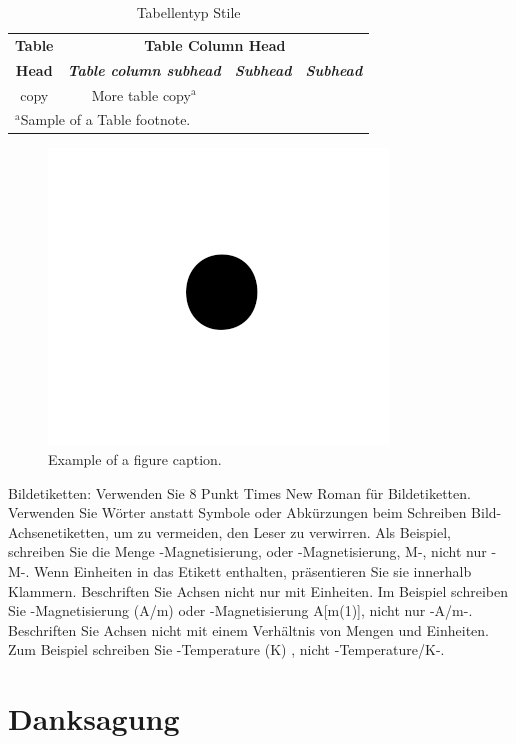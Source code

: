 \documentclass[conference]{IEEEtran}
\begin{document}
\begin{table}[htbp]
\caption{Tabellentyp Stile}
\begin{center}
\begin{tabular}{|c|c|c|c|}
\hline
\textbf{Table}&\multicolumn{3}{|c|}{\textbf{Table Column Head}} \\
\cline{2-4} 
\textbf{Head} & \textbf{\textit{Table column subhead}}& \textbf{\textit{Subhead}}& \textbf{\textit{Subhead}} \\
\hline
copy& More table copy$^{\mathrm{a}}$& &  \\
\hline
\multicolumn{4}{l}{$^{\mathrm{a}}$Sample of a Table footnote.}
\end{tabular}
\label{tab1}
\end{center}
\end{table}

\begin{figure}[htbp]
\centerline{\includegraphics{fig1.png}}
\caption{Example of a figure caption.}
\label{fig}
\end{figure}

Bildetiketten: Verwenden Sie 8 Punkt Times New Roman für Bildetiketten. Verwenden Sie Wörter anstatt Symbole oder Abkürzungen beim Schreiben Bild-Achsenetiketten, um zu vermeiden, den Leser zu verwirren. Als Beispiel, schreiben Sie die Menge -Magnetisierung, oder -Magnetisierung, M-, nicht nur -M-. Wenn Einheiten in das Etikett enthalten, präsentieren Sie sie innerhalb Klammern. Beschriften Sie Achsen nicht nur mit Einheiten. Im Beispiel schreiben Sie -Magnetisierung (A/m) oder -Magnetisierung {A[m(1)]}, nicht nur -A/m-. Beschriften Sie Achsen nicht mit einem Verhältnis von Mengen und Einheiten. Zum Beispiel schreiben Sie -Temperature (K) , nicht -Temperature/K-.

\section*{Danksagung}
\end{document}

